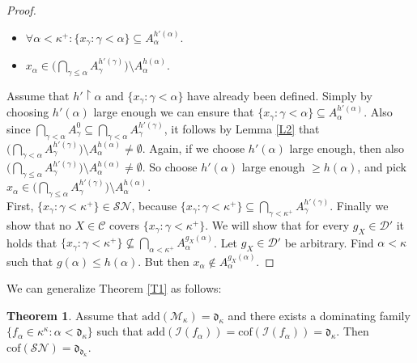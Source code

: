 \documentclass[12pt,a4paper]{scrartcl}
\theoremstyle{definition}
\newtheorem{theorem}[definition]{Theorem}
\numberwithin{equation}{section}
\begin{document}
\begin{proof}
\begin{itemize}
\item $\forall \alpha <\kappa^+ \colon \{x_\gamma \colon \gamma < \alpha\} \subseteq  A_\alpha^{h'(\alpha)}$.
\item $x_\alpha \in \big (\bigcap_{\gamma \leq \alpha} A_\gamma^{h'(\gamma)} \big ) \setminus A_\alpha^{h(\alpha)}$.
\end{itemize}
Assume that $h' \restriction \alpha$ and $\{x_\gamma \colon \gamma < \alpha\}$ have already been defined. Simply by choosing $h'(\alpha)$ large enough we can ensure that $\{x_\gamma \colon \gamma < \alpha\} \subseteq A_\alpha^{h'(\alpha)}$. Also since $\bigcap_{\gamma < \alpha} A_\gamma^0 \subseteq \bigcap_{\gamma < \alpha} A_\gamma^{h'(\gamma)}$, it follows by Lemma \ref{L2} that $\big (\bigcap_{\gamma < \alpha} A_\gamma^{h'(\gamma)} \big ) \setminus  A_\alpha^{h(\alpha)} \neq \emptyset$. Again, if we choose $h'(\alpha)$ large enough, then also $\big (\bigcap_{\gamma \leq \alpha} A_\gamma^{h'(\gamma)} \big )\setminus  A_\alpha^{h(\alpha)} \neq \emptyset$. So choose $h'(\alpha)$ large enough $\geq h(\alpha)$, and pick $x_\alpha \in \big (\bigcap_{\gamma \leq \alpha} A_\gamma^{h'(\gamma)} \big) \setminus  A_\alpha^{h(\alpha)}$.\\
First, $\{x_\gamma \colon \gamma < \kappa^+\} \in \mathcal{SN}$, because $\{x_\gamma \colon \gamma < \kappa^+\} \subseteq \bigcap_{\gamma < \kappa^+} A_\gamma^{h'(\gamma)}$. Finally we show that no $X \in \mathcal{C}$ covers $\{x_\gamma \colon \gamma < \kappa^+\}$. We will show that for every $g_X \in  \mathcal{D}'$ it holds that $\{x_\gamma \colon \gamma < \kappa^+\} \nsubseteq \bigcap_{\alpha < \kappa^+} A_\alpha^{g_X(\alpha)}$. Let $g_X \in  \mathcal{D}'$ be arbitrary. Find $\alpha < \kappa$ such that $g(\alpha) \leq h(\alpha)$. But then $x_\alpha \notin A_\alpha^{g_X(\alpha)}$.
\end{proof}

We can generalize Theorem \ref{T1} as follows:

\begin{theorem} \label{T2}
Assume that $\text{add}(\mathcal{M}_\kappa)=\mathfrak{d}_\kappa$ and there exists a dominating family $\{f_\alpha \in \kappa^\kappa \colon \alpha < \mathfrak{d}_\kappa\}$ such that $\text{add}(\mathcal{I}(f_\alpha))=\text{cof}(\mathcal{I}(f_\alpha)) =\mathfrak{d}_\kappa$. Then $\text{cof}(\mathcal{SN})=\mathfrak{d}_{\mathfrak{d}_\kappa}$.
\end{theorem}
\end{document}
